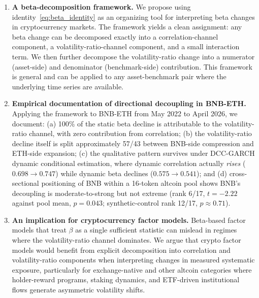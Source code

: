 \documentclass[11pt,a4paper]{article}
\begin{document}
\begin{enumerate}
\item \textbf{A beta-decomposition framework.} We propose using identity~\eqref{eq:beta_identity} as an organizing tool for interpreting beta changes in cryptocurrency markets. The framework yields a clean assignment: any beta change can be decomposed exactly into a correlation-channel component, a volatility-ratio-channel component, and a small interaction term. We then further decompose the volatility-ratio change into a numerator (asset-side) and denominator (benchmark-side) contribution. This framework is general and can be applied to any asset-benchmark pair where the underlying time series are available.

\item \textbf{Empirical documentation of directional decoupling in BNB-ETH.} Applying the framework to BNB-ETH from May 2022 to April 2026, we document: (a) 100\% of the static beta decline is attributable to the volatility-ratio channel, with zero contribution from correlation; (b) the volatility-ratio decline itself is split approximately 57/43 between BNB-side compression and ETH-side expansion; (c) the qualitative pattern survives under DCC-GARCH dynamic conditional estimation, where dynamic correlation actually \emph{rises} ($0.698 \to 0.747$) while dynamic beta declines ($0.575 \to 0.541$); and (d) cross-sectional positioning of BNB within a 16-token altcoin pool shows BNB's decoupling is moderate-to-strong but not extreme (rank 6/17, $t=-2.22$ against pool mean, $p=0.043$; synthetic-control rank 12/17, $p\approx 0.71$).

\item \textbf{An implication for cryptocurrency factor models.} Beta-based factor models that treat $\beta$ as a single sufficient statistic can mislead in regimes where the volatility-ratio channel dominates. We argue that crypto factor models would benefit from explicit decomposition into correlation and volatility-ratio components when interpreting changes in measured systematic exposure, particularly for exchange-native and other altcoin categories where holder-reward programs, staking dynamics, and ETF-driven institutional flows generate asymmetric volatility shifts.
\end{enumerate}
\end{document}
